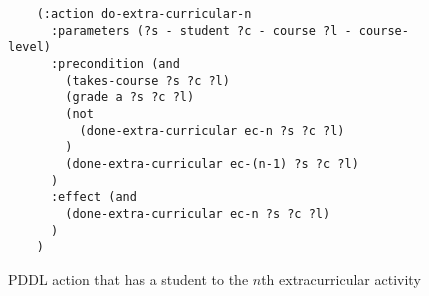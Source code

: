 \begin{figure}[t]
    \begin{lstlisting}
    (:action do-extra-curricular-n
      :parameters (?s - student ?c - course ?l - course-level)
      :precondition (and 
        (takes-course ?s ?c ?l)
        (grade a ?s ?c ?l)
        (not
          (done-extra-curricular ec-n ?s ?c ?l)
        )
        (done-extra-curricular ec-(n-1) ?s ?c ?l)
      )
      :effect (and 
        (done-extra-curricular ec-n ?s ?c ?l)
      )
    )
    \end{lstlisting}
    \caption{PDDL action that has a student to the $n$th extracurricular activity}\label{fig:pddl-action-extra-curricular-n}
\end{figure}